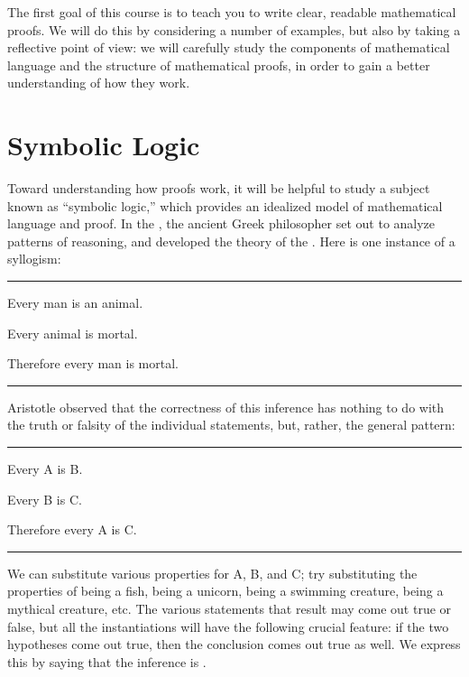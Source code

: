 \documentclass[letterpaper,10pt,english]{sphinxmanual}
\begin{document}
\sphinxAtStartPar
The first goal of this course is to teach you to write clear, readable mathematical proofs. We will do this by considering a number of examples, but also by taking a reflective point of view: we will carefully study the components of mathematical language and the structure of mathematical proofs, in order to gain a better understanding of how they work.


\section{Symbolic Logic}
\label{\detokenize{introduction:symbolic-logic}}
\sphinxAtStartPar
Toward understanding how proofs work, it will be helpful to study a subject known as “symbolic logic,” which provides an idealized model of mathematical language and proof. In the , the ancient Greek philosopher set out to analyze patterns of reasoning, and developed the theory of the . Here is one instance of a syllogism:


\bigskip\hrule\bigskip


\sphinxAtStartPar
Every man is an animal.

\sphinxAtStartPar
Every animal is mortal.

\sphinxAtStartPar
Therefore every man is mortal.


\bigskip\hrule\bigskip


\sphinxAtStartPar
Aristotle observed that the correctness of this inference has nothing to do with the truth or falsity of the individual statements, but, rather, the general pattern:


\bigskip\hrule\bigskip


\sphinxAtStartPar
Every A is B.

\sphinxAtStartPar
Every B is C.

\sphinxAtStartPar
Therefore every A is C.


\bigskip\hrule\bigskip


\sphinxAtStartPar
We can substitute various properties for A, B, and C; try substituting the properties of being a fish, being a unicorn, being a swimming creature, being a mythical creature, etc. The various statements that result may come out true or false, but all the instantiations will have the following crucial feature: if the two hypotheses come out true, then the conclusion comes out true as well. We express this by saying that the inference is .
\end{document}
